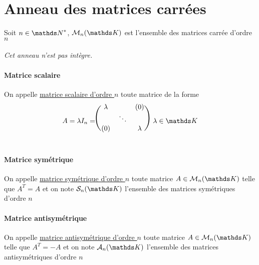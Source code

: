 	\section{Anneau des matrices carrées}
		Soit $n\in\N^*$, $\M_n(\K )$ est l'ensemble des matrices carrée d'ordre $n$ \vspace*{0.5cm} \\
		\vspace*{-1.2cm} \\ \textit{Cet anneau n'est pas intègre.}
		\traitd 
		\paragraph{Matrice scalaire} On appelle \underline{matrice scalaire d'ordre $n$} toute matrice de la forme \\ \[ A=\lambda I_n = 
			\begin{blockarray}{(ccc)} \lambda & & (0) \\ & \ddots & \\ (0) & & \lambda \end{blockarray} ~~\lambda\in\K \] \trait ${}$ \vspace*{-1.2cm} \traitd
		\paragraph{Matrice symétrique} On appelle \underline{matrice symétrique d'ordre $n$} toute matrice $A \in\M_n (\K )$ telle que $A^T=A$ et 
			on note $\mathcal{S}_n (\K )$ l'ensemble des matrices symétriques d'ordre $n$ \trait ${}$ \vspace*{-1.3cm} \traitd
		\paragraph{Matrice antisymétrique} On appelle \underline{matrice antisymétrique d'ordre $n$} toute matrice $A\in\M_n(\K )$ telle que 
			$A^T=-A$ et on note $\mathcal{A}_n (\K )$ l'ensemble des matrices antisymétriques d'ordre $n$ \trait
		\newpage ${}$ \\ 
		\vspace*{0.5cm} \\  \traitd
